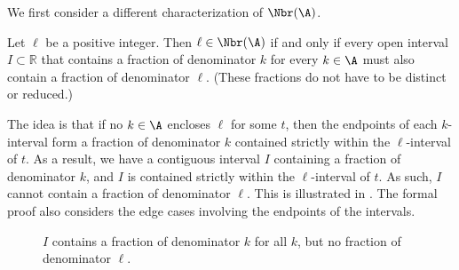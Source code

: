 \documentclass{toc}
\begin{document}
We first consider a different characterization of $\Nbr(\A)$.

\begin{claim}
    \label{claim:intervalcondition}
    Let $\ell$ be a positive integer. Then $\ell\in \Nbr(\A)$ if and only if every open interval $I\subset \mathbb{R}$ that contains a fraction of denominator $k$ for every $k\in \A$ must also contain a fraction of denominator $\ell$. (These fractions do not have to be distinct or reduced.)
\end{claim}

The idea is that if no $k\in \A$ encloses $\ell$ for some $t$, then the endpoints of each $k$-interval form a fraction of denominator $k$ contained strictly within the $\ell$-interval of $t$. As a result, we have a contiguous interval $I$ containing a fraction of denominator $k$, and $I$ is contained strictly within the $\ell$-interval of $t$. As such, $I$ cannot contain a fraction of denominator $\ell$. This is illustrated in . The formal proof also considers the edge cases involving the endpoints of the intervals.

\begin{figure}[ht]
    \centering
    \caption{$I$ contains a fraction of denominator $k$ for all $k$, but no fraction of denominator $\ell$.}
    \label{fig:intervalcondition}
\end{figure}
\end{document}
